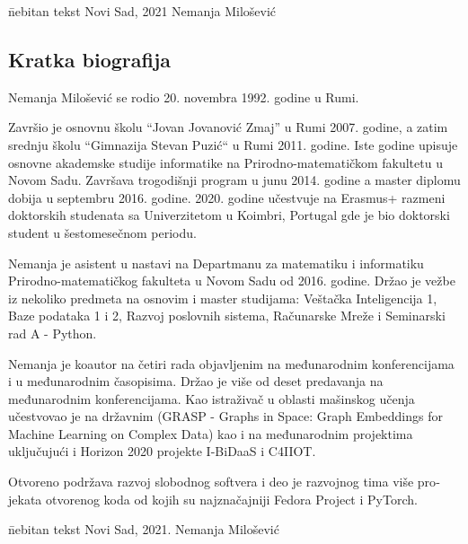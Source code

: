 \documentclass[b5paper]{book}
\begin{document}
\vfill


\begin{tabbing}
  \hspace{0.7\textwidth} \= nebitan tekst \kill
  Novi Sad, 2021 \> Nemanja Milošević
\end{tabbing}

\begin{otherlanguage}{english}
\chapter{Kratka biografija}

Nemanja Milošević se rodio 20. novembra 1992. godine u Rumi.

Završio je osnovnu školu ``Jovan Jovanović Zmaj'' u Rumi 2007. godine, a zatim srednju školu ``Gimnazija Stevan Puzić`` u Rumi 2011. godine. Iste godine upisuje osnovne akademske studije informatike na Prirodno-matematičkom fakultetu u Novom Sadu. Završava trogodišnji program u junu 2014. godine a master diplomu dobija u septembru 2016. godine. 2020. godine učestvuje na Erasmus+ razmeni doktorskih studenata sa Univerzitetom u Koimbri, Portugal gde je bio doktorski student u šestomesečnom periodu.

Nemanja je asistent u nastavi na Departmanu za matematiku i informatiku Prirodno-matematičkog fakulteta u Novom Sadu od 2016. godine. Držao je vežbe iz nekoliko predmeta na osnovim i master studijama: Veštačka Inteligencija 1, Baze podataka 1 i 2, Razvoj poslovnih sistema, Računarske Mreže i Seminarski rad A - Python.

Nemanja je koautor na četiri rada objavljenim na međunarodnim konferencijama i u međunarodnim časopisima. Držao je više od deset predavanja na međunarodnim konferencijama. Kao istraživač u oblasti mašinskog učenja učestvovao je na državnim (GRASP - Graphs in Space: Graph Embeddings for Machine Learning on Complex Data) kao i na međunarodnim projektima uključujući i Horizon 2020 projekte I-BiDaaS i C4IIOT.

Otvoreno podržava razvoj slobodnog softvera i deo je razvojnog tima više projekata otvorenog koda od kojih su najznačajniji Fedora Project i PyTorch.

\vfill


\begin{tabbing}
  \hspace{0.7\textwidth} \= nebitan tekst \kill
  Novi Sad, 2021. \> Nemanja Milošević\\
  \\
  \> \makebox[0.3\textwidth]{\dotfill}
\end{tabbing}

\end{otherlanguage}


\end{document}
